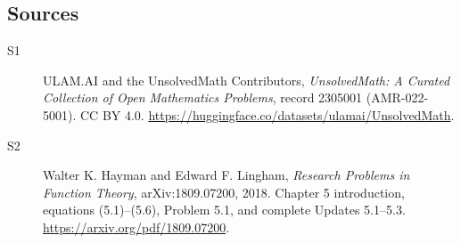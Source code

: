 \documentclass[11pt]{book}
\begin{document}
\subsection{Sources}
\begin{description}
\item[\hypertarget{source:2305001:1}{S1}] ULAM.AI and the UnsolvedMath Contributors, \emph{UnsolvedMath: A Curated Collection of Open Mathematics Problems}, record 2305001 (AMR-022-5001). CC BY 4.0. \url{https://huggingface.co/datasets/ulamai/UnsolvedMath}.
\item[\hypertarget{source:2305001:2}{S2}] Walter K. Hayman and Edward F. Lingham, \emph{Research Problems in Function Theory}, arXiv:1809.07200, 2018. Chapter 5 introduction, equations (5.1)--(5.6), Problem 5.1, and complete Updates 5.1--5.3. \url{https://arxiv.org/pdf/1809.07200}.
\end{description}
\label{end:2305001}
\end{document}
